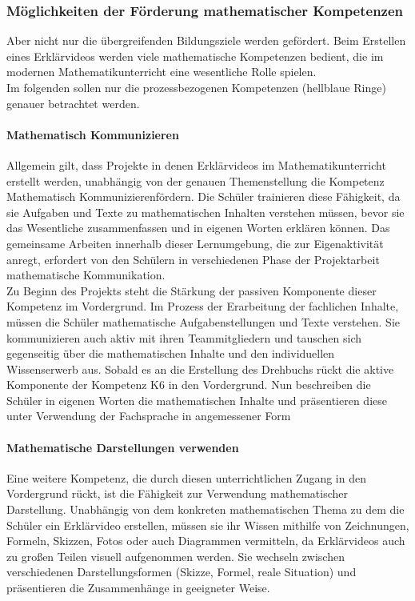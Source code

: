 \documentclass[a4paper,12pt,twoside=false]{scrartcl}
\begin{document}
\subsubsection{Möglichkeiten der Förderung mathematischer Kompetenzen}
Aber nicht nur die übergreifenden Bildungsziele werden gefördert. Beim Erstellen eines Erklärvideos werden viele mathematische Kompetenzen bedient, die im modernen Mathematikunterricht eine wesentliche Rolle spielen. \\
Im folgenden sollen nur die prozessbezogenen Kompetenzen (hellblaue Ringe) genauer betrachtet werden. \\
\paragraph{Mathematisch Kommunizieren}
Allgemein gilt, dass Projekte in denen Erklärvideos im Mathematikunterricht erstellt werden, unabhängig von der genauen Themenstellung die Kompetenz \glqq Mathematisch Kommunizieren\grqq fördern.  Die Schüler trainieren diese Fähigkeit, da sie Aufgaben und Texte zu mathematischen Inhalten verstehen müssen, bevor sie das Wesentliche zusammenfassen und in eigenen Worten erklären können. Das gemeinsame Arbeiten innerhalb dieser Lernumgebung, die zur Eigenaktivität anregt, erfordert von den Schülern in verschiedenen Phase der Projektarbeit mathematische Kommunikation. \\
Zu Beginn des Projekts steht die Stärkung der passiven Komponente dieser Kompetenz im Vordergrund. Im Prozess der Erarbeitung der fachlichen Inhalte, müssen die Schüler mathematische Aufgabenstellungen und Texte verstehen. Sie kommunizieren auch aktiv mit ihren Teammitgliedern und tauschen sich gegenseitig über die mathematischen Inhalte und den individuellen Wissenserwerb aus. Sobald es an die Erstellung des Drehbuchs rückt die aktive Komponente der Kompetenz K6 in den Vordergrund. Nun beschreiben die Schüler  in eigenen Worten die mathematischen Inhalte und präsentieren diese unter Verwendung der Fachsprache in angemessener Form\\ %
\paragraph{Mathematische Darstellungen verwenden}
Eine weitere Kompetenz, die durch diesen unterrichtlichen Zugang in den Vordergrund rückt, ist die Fähigkeit zur Verwendung mathematischer Darstellung. Unabhängig von dem konkreten mathematischen Thema zu dem die Schüler ein Erklärvideo erstellen, müssen sie ihr Wissen mithilfe von Zeichnungen, Formeln, Skizzen, Fotos oder auch Diagrammen vermitteln, da Erklärvideos auch zu großen Teilen visuell aufgenommen werden. Sie wechseln zwischen verschiedenen Darstellungsformen (Skizze, Formel, reale Situation) und präsentieren die Zusammenhänge in geeigneter Weise. \\
\end{document}
